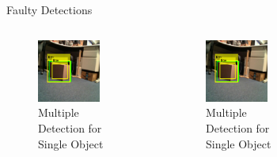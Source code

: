 \documentclass[10pt]{beamer}
\begin{document}
\begin{frame}{Faulty Detections}
\begin{columns}
     \begin{figure}
         \centering
         \includegraphics[width=0.7\textwidth]{Images/ft1.png}
         \caption{Multiple Detection for Single Object}
     \end{figure}
     \vspace{-20pt}
     \begin{figure}
         \centering
         \includegraphics[width=0.7\textwidth]{Images/ft1.png}
         \caption{Multiple Detection for Single Object}
     \end{figure}  
     \begin{figure}
         \centering

\end{figure}
\end{columns}
\end{frame}
\end{document}
